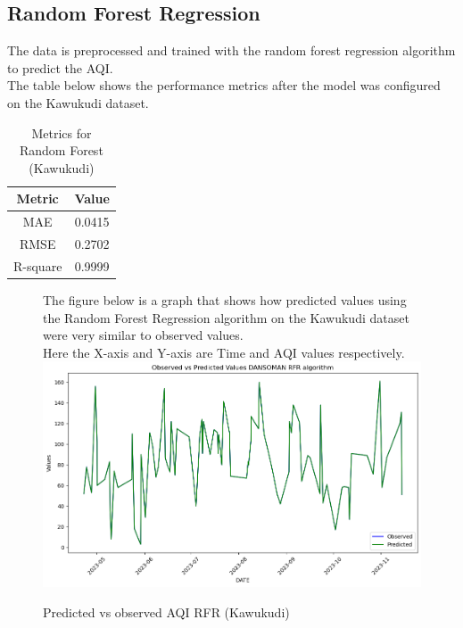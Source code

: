 \documentclass{book}
\numberwithin{equation}{section}
\numberwithin{figure}{section}
\begin{document}
\subsection{Random Forest Regression}
The data is preprocessed and trained with the random forest regression algorithm to predict the AQI.\\ The table below shows the performance metrics after the model was configured on the Kawukudi dataset.\\
\begin{table}[H]
    \centering
    \begin{tabular}{|c|c|}
        \hline
        \textbf{Metric} & \textbf{Value} \\
        \hline
        MAE & 0.0415 \\
        \hline
        RMSE & 0.2702\\
        \hline
        R-square & 0.9999\\
        \hline
    \end{tabular}
    \caption{Metrics for Random Forest (Kawukudi)}
    \label{tab: RFR metrics(Kawukudi)}
\end{table}
\begin{figure}[H]
 \begin{minipage}{\linewidth}
        The figure below is a graph that shows how predicted values using the Random Forest Regression algorithm on the Kawukudi dataset were very similar to observed values. \\Here the X-axis and Y-axis are Time and AQI values respectively.
        \vspace{0.5em} 
        \includegraphics[width=\linewidth]{kawukudi rfr.png}
       
        \caption{ Predicted vs observed AQI RFR (Kawukudi) }
        \label{fig: RFR predicted vs observed AQI(Kawukudi)}
    \end{minipage}
\end{figure}
\end{document}
